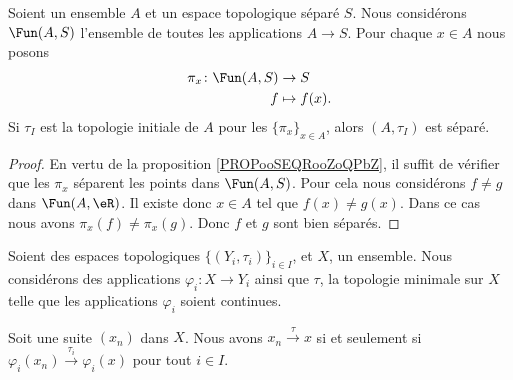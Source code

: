 \begin{lemma}	\label{LEMooZLZKooHElBOs}
	Soient un ensemble \( A\) et un espace topologique séparé \( S\). Nous considérons \( \Fun(A,S)\) l'ensemble de toutes les applications \( A\to S\). Pour chaque \( x\in A\) nous posons
	\begin{equation}
		\begin{aligned}
			\pi_x\colon \Fun(A,S) & \to S         \\
			f                     & \mapsto f(x).
		\end{aligned}
	\end{equation}
	Si \( \tau_I\) est la topologie initiale de \( A\) pour les \( \{ \pi_x \}_{x\in A}\), alors \( (A,\tau_I)\) est séparé.
\end{lemma}

\begin{proof}
	En vertu de la proposition \ref{PROPooSEQRooZoQPbZ}, il suffit de vérifier que les \( \pi_x\) séparent les points dans \( \Fun(A,S)\). Pour cela nous considérons \( f\neq g\) dans \( \Fun(A,\eR)\). Il existe donc \( x\in A\) tel que \( f(x)\neq g(x)\). Dans ce cas nous avons \( \pi_x(f)\neq \pi_x(g)\). Donc \( f\) et \( g\) sont bien séparés.
\end{proof}

\begin{lemma}     \label{LEMooADPLooYylNsj}
	Soient des espaces topologiques \( \{ (Y_i,\tau_i) \}_{i\in I}\), et \( X\), un ensemble. Nous considérons des applications \( \varphi_i\colon X\to Y_i\) ainsi que \( \tau\), la topologie minimale sur \( X\) telle que les applications \( \varphi_i\) soient continues.

	Soit une suite \( (x_n)\) dans \( X\). Nous avons \( x_n\stackrel{\tau}{\longrightarrow}x\) si et seulement si \( \varphi_i(x_n)\stackrel{\tau_i}{\longrightarrow}\varphi_i(x)\) pour tout \( i\in I\).
\end{lemma}


